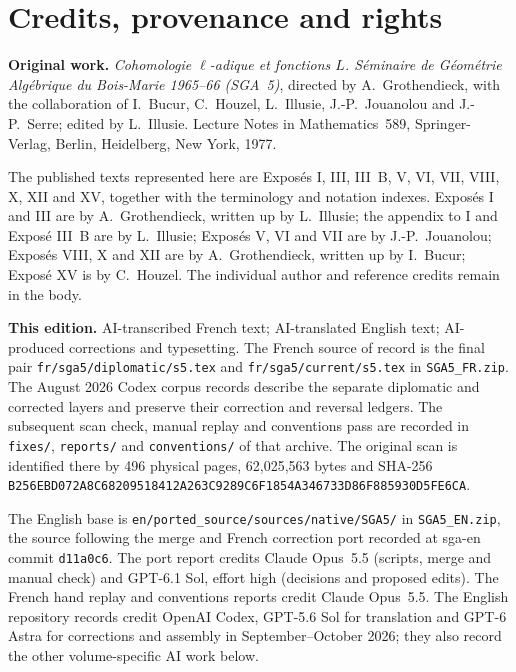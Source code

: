\section*{Credits, provenance and rights}
\begingroup\small
\noindent\textbf{Original work.} \textit{Cohomologie $\ell$-adique et fonctions $L$. S\'eminaire de G\'eom\'etrie Alg\'ebrique du Bois-Marie 1965--66 (SGA~5)}, directed by A.~Grothendieck, with the collaboration of I.~Bucur, C.~Houzel, L.~Illusie, J.-P.~Jouanolou and J.-P.~Serre; edited by L.~Illusie. Lecture Notes in Mathematics~589, Springer-Verlag, Berlin, Heidelberg, New York, 1977.

The published texts represented here are Expos\'es I, III, III~B, V, VI, VII, VIII, X, XII and XV, together with the terminology and notation indexes. Expos\'es I and III are by A.~Grothendieck, written up by L.~Illusie; the appendix to I and Expos\'e III~B are by L.~Illusie; Expos\'es V, VI and VII are by J.-P.~Jouanolou; Expos\'es VIII, X and XII are by A.~Grothendieck, written up by I.~Bucur; Expos\'e XV is by C.~Houzel. The individual author and reference credits remain in the body.

\noindent\textbf{This edition.} AI-transcribed French text; AI-translated English text; AI-produced corrections and typesetting. The French source of record is the final pair \texttt{fr/sga5/diplomatic/s5.tex} and \texttt{fr/sga5/current/s5.tex} in \texttt{SGA5\_FR.zip}. The August 2026 Codex corpus records describe the separate diplomatic and corrected layers and preserve their correction and reversal ledgers. The subsequent scan check, manual replay and conventions pass are recorded in \texttt{fixes/}, \texttt{reports/} and \texttt{conventions/} of that archive. The original scan is identified there by 496 physical pages, 62,025,563 bytes and SHA-256 \texttt{B256EBD072A8C68209518412A263C928}\allowbreak\texttt{9C6F1854A346733D86F885930D5FE6CA}.

The English base is \texttt{en/ported\_source/sources/native/SGA5/} in \texttt{SGA5\_EN.zip}, the source following the merge and French correction port recorded at sga-en commit \texttt{d11a0c6}. The port report credits Claude Opus~5.5 (scripts, merge and manual check) and GPT-6.1 Sol, effort high (decisions and proposed edits). The French hand replay and conventions reports credit Claude Opus~5.5. The English repository records credit OpenAI Codex, GPT-5.6 Sol for translation and GPT-6 Astra for corrections and assembly in September--October 2026; they also record the other volume-specific AI work below.

